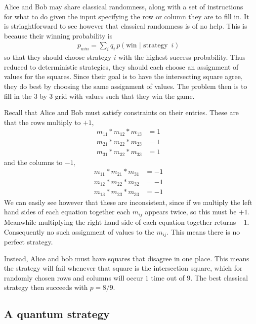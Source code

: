 \documentclass[a4paper,11pt]{article}
\begin{document}
Alice and Bob may share classical randomness, along with a set of instructions for what to do given the input specifying the row or column they are to fill in. It is striaghtforward to see however that classical randomness is of no help. This is because their winning probability is
\begin{align}
    p_{win} = \sum_i q_i \, p(\text{win | strategy }\,i)
\end{align}
so that they should choose strategy $i$ with the highest success probability. Thus reduced to deterministic strategies, they should each choose an assignment of values for the squares. Since their goal is to have the intersecting square agree, they do best by choosing the same assignment of values. The problem then is to fill in the 3 by 3 grid with values such that they win the game. 

Recall that Alice and Bob must satisfy constraints on their entries. These are that the rows multiply to $+1$,
\begin{align}
    m_{11}*m_{12}*m_{13} &= 1 \\
    m_{21}*m_{22}*m_{23} &= 1 \\
    m_{31}*m_{32}*m_{33} &= 1
\end{align}
and the columns to $-1$,
\begin{align}
    m_{11}*m_{21}*m_{31} &= -1 \\
    m_{12}*m_{22}*m_{32} &= -1 \\
    m_{13}*m_{23}*m_{33} &= -1 
\end{align}
We can easily see however that these are inconsistent, since if we multiply the  left hand sides of each equation together each $m_{ij}$ appears twice, so this must be $+1$. Meanwhile multiplying the right hand side of each equation together returns $-1$. Consequently no such assignment of values to the $m_{ij}$. This means there is no perfect strategy. 

Instead, Alice and bob must have squares that disagree in one place. This means the strategy will fail whenever that square is the intersection square, which for randomly chosen rows and columns will occur $1$ time out of $9$. The best classical strategy then succeeds with $p=8/9$. 

\subsection{A quantum strategy}
\end{document}
